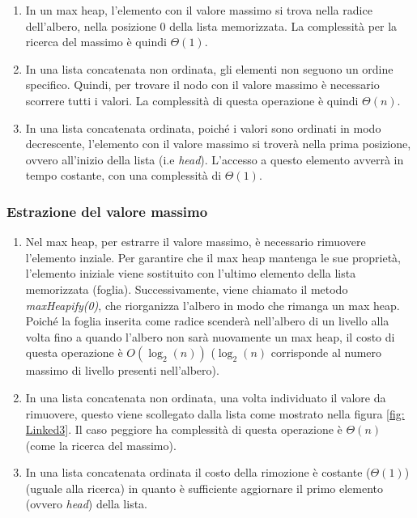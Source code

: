 \documentclass{article}
\begin{document}
    \begin{enumerate}
    
    \item In un max heap, l'elemento con il valore massimo si trova nella radice dell'albero, nella posizione $0$ della lista memorizzata. La complessità per la ricerca del massimo è quindi $\Theta(1)$.
    
    \item In una lista concatenata non ordinata, gli elementi non seguono un ordine specifico. Quindi, per trovare il nodo con il valore massimo è necessario scorrere tutti i valori. La complessità di questa operazione è quindi $\Theta(n)$.
    
    \item In una lista concatenata ordinata, poiché i valori sono ordinati in modo decrescente, l'elemento con il valore massimo si troverà nella prima posizione, ovvero all'inizio della lista (i.e \textit{head}). L'accesso a questo elemento avverrà in tempo costante, con una complessità di $\Theta(1)$.
    
    \end{enumerate}

\subsubsection{Estrazione del valore massimo}

    \begin{enumerate}
    
    \item Nel max heap, per estrarre il valore massimo, è necessario rimuovere l'elemento inziale. Per garantire che il max heap mantenga le sue proprietà, l'elemento iniziale viene sostituito con l'ultimo elemento della lista memorizzata (foglia). Successivamente, viene chiamato il metodo \textit{maxHeapify(0)}, che riorganizza l'albero in modo che rimanga un max heap. Poiché la foglia inserita come radice scenderà nell'albero di un livello alla volta fino a quando l'albero non sarà nuovamente un max heap, il costo di questa operazione è $O(\log_2(n))$ ($\log_2(n)$ corrisponde al numero massimo di livello presenti nell'albero).
    
    \item In una lista concatenata non ordinata, una volta individuato il valore da rimuovere, questo viene scollegato dalla lista come mostrato nella figura \ref{fig: Linked3}. Il caso peggiore ha complessità di questa operazione è $\Theta(n)$ (come la ricerca del massimo).
    
    \item In una lista concatenata ordinata il costo della rimozione è costante ($\Theta(1)$) (uguale alla ricerca) in quanto è sufficiente aggiornare il primo elemento (ovvero \textit{head}) della lista.
    
    \end{enumerate}
\end{document}
